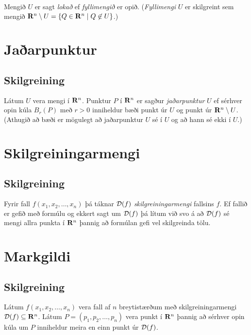 \documentclass[a4paper,10pt,icelandic]{sphinxmanual}
\begin{document}
Mengið \(U\) er sagt \textit{lokað} ef \textit{fyllimengið} er opið. (\emph{Fyllimengi}
\(U\) er skilgreint sem mengið
\(\mbox{${\bf R}^n$}\setminus U=\{Q\in \mbox{${\bf R}^n$}\mid Q\mbox{$\;\not\in\;$}U\}\).)


\section{Jaðarpunktur}
\label{Kafli2:jaarpunktur}

\subsection{Skilgreining}
\label{Kafli2:index-5}\label{Kafli2:id5}
Látum \(U\) vera mengi í \(\mbox{${\bf R}^n$}\). Punktur
\(P\) í \(\mbox{${\bf R}^n$}\) er sagður \textit{jaðarpunktur}
\(U\) ef sérhver opin kúla \(B_r(P)\) með \(r>0\) inniheldur
bæði punkt úr \(U\) og punkt úr
\(\mbox{${\bf R}^n$}\setminus U\). (Athugið að bæði er mögulegt að
jaðarpunktur \(U\) sé í \(U\) og að hann sé ekki í \(U\).)


\section{Skilgreiningarmengi}
\label{Kafli2:skilgreiningarmengi}

\subsection{Skilgreining}
\label{Kafli2:id6}\label{Kafli2:index-6}
Fyrir fall \(f(x_1,x_2,\ldots,x_n)\) þá táknar \({\cal D}(f)\)
\textit{skilgreiningarmengi} fallsins \(f\). Ef fallið er gefið með formúlu
og ekkert sagt um \({\cal D}(f)\) þá lítum við svo á að
\({\cal D}(f)\) sé mengi allra punkta í \(\mbox{${\bf R}^n$}\)
þannig að formúlan gefi vel skilgreinda tölu.


\section{Markgildi}
\label{Kafli2:index-7}\label{Kafli2:markgildi}

\subsection{Skilgreining}
\label{Kafli2:id7}
Látum \(f(x_1,x_2,\ldots,x_n)\) vera fall af \(n\) breytistærðum
með skilgreiningarmengi \({\cal D}(f)\subseteq \mbox{${\bf R}^n$}\).
Látum \(P=(p_1,p_2,\ldots,p_n)\) vera punkt í
\(\mbox{${\bf R}^n$}\) þannig að sérhver opin kúla um \(P\)
inniheldur meira en einn punkt úr \({\cal D}(f)\).
\end{document}
